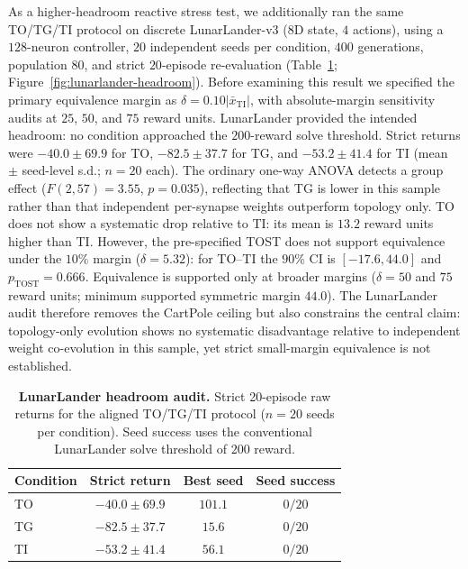 \documentclass[10pt]{article}
\begin{document}
As a higher-headroom reactive stress test, we additionally ran the same
TO/TG/TI protocol on discrete LunarLander-v3 ($8$D state, $4$ actions), using a
$128$-neuron controller, $20$ independent seeds per condition, $400$
generations, population $80$, and strict $20$-episode re-evaluation
(Table~\ref{tab:lunarlander-headroom}; Figure~\ref{fig:lunarlander-headroom}).
Before examining this result we specified the primary equivalence margin as
$\delta=0.10|\bar{x}_{\mathrm{TI}}|$, with absolute-margin sensitivity audits at
$25$, $50$, and $75$ reward units. LunarLander provided the intended headroom:
no condition approached the $200$-reward solve threshold. Strict returns were
$-40.0\pm69.9$ for TO, $-82.5\pm37.7$ for TG, and $-53.2\pm41.4$ for TI
(mean $\pm$ seed-level s.d.; $n=20$ each). The ordinary one-way ANOVA detects a
group effect ($F(2,57)=3.55$, $p=0.035$), reflecting that TG is lower in this
sample rather than that independent per-synapse weights outperform topology
only. TO does not show a systematic drop relative to TI: its mean is $13.2$
reward units higher than TI. However, the pre-specified TOST does not support
equivalence under the $10\%$ margin ($\delta=5.32$): for TO--TI the $90\%$ CI is
$[-17.6,44.0]$ and $p_{\mathrm{TOST}}=0.666$. Equivalence is supported only at
broader margins ($\delta=50$ and $75$ reward units; minimum supported symmetric
margin $44.0$). The LunarLander audit therefore removes the CartPole ceiling but
also constrains the central claim: topology-only evolution shows no systematic
disadvantage relative to independent weight co-evolution in this sample, yet
strict small-margin equivalence is not established.

\begin{table}[H]
\centering
\small
\caption{\textbf{LunarLander headroom audit.} Strict 20-episode raw returns for
the aligned TO/TG/TI protocol ($n=20$ seeds per condition). Seed success uses
the conventional LunarLander solve threshold of $200$ reward.}
\label{tab:lunarlander-headroom}
\begin{tabular}{@{}lccc@{}}
\toprule
\textbf{Condition} & \textbf{Strict return} & \textbf{Best seed} & \textbf{Seed success} \\
\midrule
TO & $-40.0\pm69.9$ & $101.1$ & $0/20$ \\
TG & $-82.5\pm37.7$ & $15.6$ & $0/20$ \\
TI & $-53.2\pm41.4$ & $56.1$ & $0/20$ \\
\bottomrule
\end{tabular}
\end{table}
\end{document}
